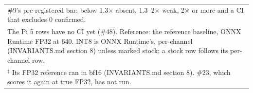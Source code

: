 \begin{tabular}{llrrrrrl}
\multicolumn{8}{l}{\footnotesize \#9's pre-registered bar: below 1.3$\times$ absent, 1.3--2$\times$ weak, 2$\times$ or more and a CI that excludes 0 confirmed.} \\
\multicolumn{8}{l}{\footnotesize The Pi 5 rows have no CI yet (\#48). Reference: the reference baseline, ONNX Runtime FP32 at 640. INT8 is ONNX Runtime's, per-channel (INVARIANTS.md section 8) unless marked stock; a stock row follows its per-channel row.} \\
\multicolumn{8}{l}{\footnotesize $^{\ddagger}$ Its FP32 reference ran in bf16 (INVARIANTS.md section 8). \#23, which scores it again at true FP32, has not run.} \\
\end{tabular}
